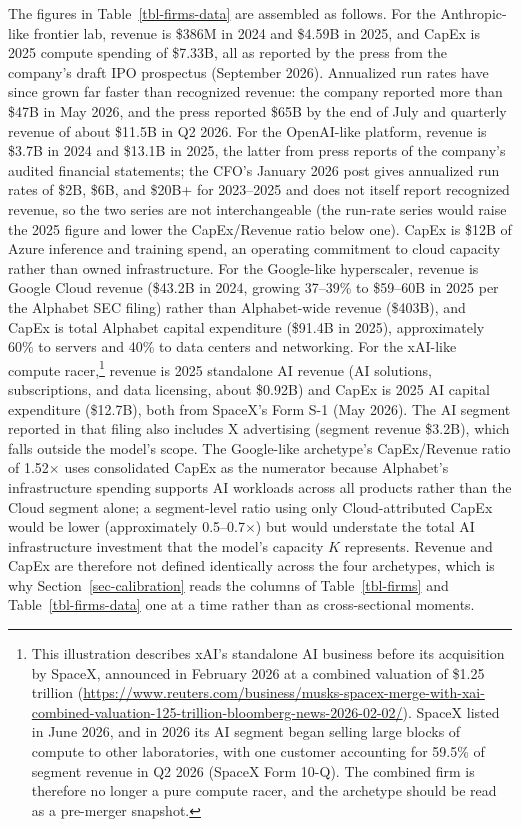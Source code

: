 \documentclass[
  11pt,
  letterpaper,
]{scrartcl}
\begin{document}
The figures in Table~\ref{tbl-firms-data} are assembled as follows. For
the Anthropic-like frontier lab, revenue is \$386M in 2024 and \$4.59B
in 2025, and CapEx is 2025 compute spending of \$7.33B, all as reported
by the press from the company's draft IPO prospectus (September 2026).
Annualized run rates have since grown far faster than recognized
revenue: the company reported more than \$47B in May 2026, and the press
reported \$65B by the end of July and quarterly revenue of about \$11.5B
in Q2 2026. For the OpenAI-like platform, revenue is \$3.7B in 2024 and
\$13.1B in 2025, the latter from press reports of the company's audited
financial statements; the CFO's January 2026 post gives annualized run
rates of \$2B, \$6B, and \$20B+ for 2023--2025 and does not itself
report recognized revenue, so the two series are not interchangeable
(the run-rate series would raise the 2025 figure and lower the
CapEx/Revenue ratio below one). CapEx is \$12B of Azure inference and
training spend, an operating commitment to cloud capacity rather than
owned infrastructure. For the Google-like hyperscaler, revenue is Google
Cloud revenue (\$43.2B in 2024, growing 37--39\% to \$59--60B in 2025
per the Alphabet SEC filing) rather than Alphabet-wide revenue (\$403B),
and CapEx is total Alphabet capital expenditure (\$91.4B in 2025),
approximately 60\% to servers and 40\% to data centers and networking.
For the xAI-like compute racer,\footnote{This illustration describes
  xAI's standalone AI business before its acquisition by SpaceX,
  announced in February 2026 at a combined valuation of \$1.25 trillion
  (\url{https://www.reuters.com/business/musks-spacex-merge-with-xai-combined-valuation-125-trillion-bloomberg-news-2026-02-02/}).
  SpaceX listed in June 2026, and in 2026 its AI segment began selling
  large blocks of compute to other laboratories, with one customer
  accounting for 59.5\% of segment revenue in Q2 2026 (SpaceX Form
  10-Q). The combined firm is therefore no longer a pure compute racer,
  and the archetype should be read as a pre-merger snapshot.} revenue is
2025 standalone AI revenue (AI solutions, subscriptions, and data
licensing, about \$0.92B) and CapEx is 2025 AI capital expenditure
(\$12.7B), both from SpaceX's Form S-1 (May 2026). The AI segment
reported in that filing also includes X advertising (segment revenue
\$3.2B), which falls outside the model's scope. The Google-like
archetype's CapEx/Revenue ratio of 1.52\(\times\) uses consolidated
CapEx as the numerator because Alphabet's infrastructure spending
supports AI workloads across all products rather than the Cloud segment
alone; a segment-level ratio using only Cloud-attributed CapEx would be
lower (approximately 0.5--0.7\(\times\)) but would understate the total
AI infrastructure investment that the model's capacity \(K\) represents.
Revenue and CapEx are therefore not defined identically across the four
archetypes, which is why Section~\ref{sec-calibration} reads the columns
of Table~\ref{tbl-firms} and Table~\ref{tbl-firms-data} one at a time
rather than as cross-sectional moments.
\end{document}
